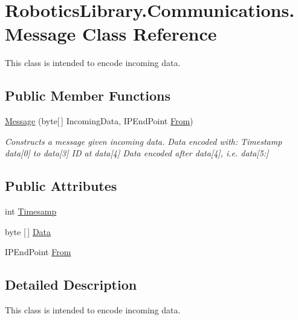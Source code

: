 \hypertarget{class_robotics_library_1_1_communications_1_1_message}{}\section{Robotics\+Library.\+Communications.\+Message Class Reference}
\label{class_robotics_library_1_1_communications_1_1_message}


This class is intended to encode incoming data.  


\subsection*{Public Member Functions}
\begin{DoxyCompactItemize}
\item 
\hyperlink{class_robotics_library_1_1_communications_1_1_message_a9e6e25188a64e3cc1c71282c2578cc4e}{Message} (byte\mbox{[}$\,$\mbox{]} Incoming\+Data, I\+P\+End\+Point \hyperlink{class_robotics_library_1_1_communications_1_1_message_a51a162a1d00eb020c5af595cc84bf604}{From})
\begin{DoxyCompactList}\small\item\em Constructs a message given incoming data. Data encoded with\+: Timestamp data\mbox{[}0\mbox{]} to data\mbox{[}3\mbox{]} ID at data\mbox{[}4\mbox{]} Data encoded after data\mbox{[}4\mbox{]}, i.\+e. data\mbox{[}5\+:\mbox{]} \end{DoxyCompactList}\end{DoxyCompactItemize}
\subsection*{Public Attributes}
\begin{DoxyCompactItemize}
\item 
int \hyperlink{class_robotics_library_1_1_communications_1_1_message_ae1ab1ac8b229f8ba8bc9ff8762c83236}{Timesamp}
\item 
byte \mbox{[}$\,$\mbox{]} \hyperlink{class_robotics_library_1_1_communications_1_1_message_a69bb31eb51f778726ae40b2257e7e053}{Data}
\item 
I\+P\+End\+Point \hyperlink{class_robotics_library_1_1_communications_1_1_message_a51a162a1d00eb020c5af595cc84bf604}{From}
\end{DoxyCompactItemize}


\subsection{Detailed Description}
This class is intended to encode incoming data. 



